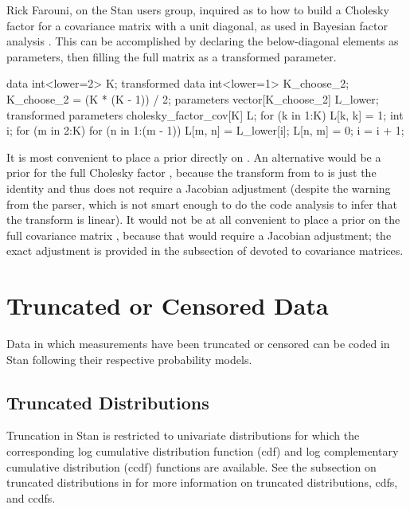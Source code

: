 Rick Farouni, on the Stan users group, inquired as to how to build
a Cholesky factor for a covariance matrix with a unit diagonal, as
used in Bayesian factor analysis \cite{aguilar-west:2000}.  This
can be accomplished by declaring the below-diagonal elements as
parameters, then filling the full matrix as a transformed parameter.
%
\begin{stancode}
data {
  int<lower=2> K;
}
transformed data {
  int<lower=1> K_choose_2;
  K_choose_2 = (K * (K - 1)) / 2;
}
parameters {
  vector[K_choose_2] L_lower;  
}
transformed parameters {
  cholesky_factor_cov[K] L;
  for (k in 1:K)
    L[k, k] = 1;
  { 
    int i;
    for (m in 2:K) {
      for (n in 1:(m - 1)) {
        L[m, n] = L_lower[i];
        L[n, m] = 0;
        i = i + 1;
      }
    }
  }
}
\end{stancode}
%
It is most convenient to place a prior directly on .
An alternative would be a prior for the full Cholesky factor ,
because the transform from  to  is just the
identity and thus does not require a Jacobian adjustment (despite the
warning from the parser, which is not smart enough to do the code
analysis to infer that the transform is linear).  It would not be at
all convenient to place a prior on the full covariance matrix , because that would require a Jacobian adjustment; the exact
adjustment is provided in the subsection of
 devoted to covariance matrices.


\chapter{Truncated or Censored Data}

\noindent
Data in which measurements have been truncated or censored can be
coded in Stan following their respective probability models.

\section{Truncated Distributions}\label{truncation.section}

Truncation in Stan is restricted to univariate distributions for which
the corresponding log cumulative distribution function (cdf) and log
complementary cumulative distribution (ccdf) functions are available.
See the subsection on truncated distributions in
 for more information on truncated
distributions, cdfs, and ccdfs.

